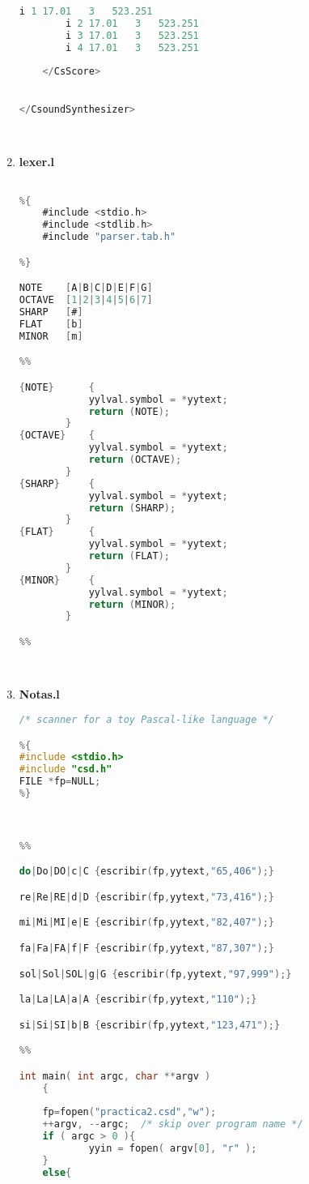 \documentclass[12pt]{article}
\begin{document}
\begin{enumerate}
\begin{lstlisting}[language=C]
		i 1	17.01	3	523.251
		i 2	17.01	3	523.251
		i 3	17.01	3	523.251
		i 4	17.01	3	523.251
	
	</CsScore>
	

</CsoundSynthesizer>	
\end{lstlisting}\\


\item {\bf lexer.l}\\
\begin{lstlisting}[language=C]

%{
	#include <stdio.h>
	#include <stdlib.h>
	#include "parser.tab.h"

%}

NOTE	[A|B|C|D|E|F|G]
OCTAVE	[1|2|3|4|5|6|7]
SHARP	[#]
FLAT	[b]
MINOR	[m]

%%

{NOTE}		{
			yylval.symbol = *yytext;
			return (NOTE);
		}
{OCTAVE}	{
			yylval.symbol = *yytext;
			return (OCTAVE);
		}
{SHARP}		{
			yylval.symbol = *yytext;
			return (SHARP);
		}
{FLAT}		{
			yylval.symbol = *yytext;
			return (FLAT);
		}
{MINOR}		{
			yylval.symbol = *yytext;	
			return (MINOR);
		}

%%

\end{lstlisting}\\

\item {\bf Notas.l}\\
\begin{lstlisting}[language=C]
/* scanner for a toy Pascal-like language */

%{
#include <stdio.h>
#include "csd.h"
FILE *fp=NULL;
%}



%%

do|Do|DO|c|C {escribir(fp,yytext,"65,406");}

re|Re|RE|d|D {escribir(fp,yytext,"73,416");}

mi|Mi|MI|e|E {escribir(fp,yytext,"82,407");}

fa|Fa|FA|f|F {escribir(fp,yytext,"87,307");}

sol|Sol|SOL|g|G {escribir(fp,yytext,"97,999");}

la|La|LA|a|A {escribir(fp,yytext,"110");}

si|Si|SI|b|B {escribir(fp,yytext,"123,471");}

%%

int main( int argc, char **argv )
    {
    
    fp=fopen("practica2.csd","w");
    ++argv, --argc;  /* skip over program name */
    if ( argc > 0 ){
            yyin = fopen( argv[0], "r" );
	}
    else{
	    

\end{lstlisting}
\end{enumerate}
\end{document}
